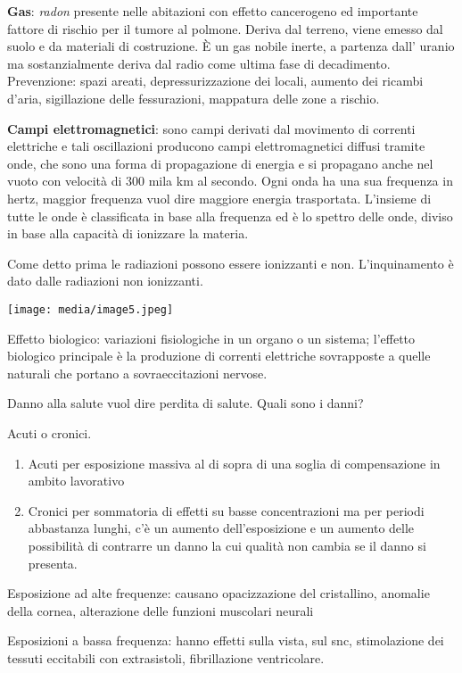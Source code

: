 \documentclass[]{article}
\begin{document}
\textbf{Gas}: \emph{radon} presente nelle abitazioni con effetto
cancerogeno ed importante fattore di rischio per il tumore al polmone.
Deriva dal terreno, viene emesso dal suolo e da materiali di
costruzione. È un gas nobile inerte, a partenza dall' uranio ma
sostanzialmente deriva dal radio come ultima fase di decadimento.
Prevenzione: spazi areati, depressurizzazione dei locali, aumento dei
ricambi d'aria, sigillazione delle fessurazioni, mappatura delle zone a
rischio.

\textbf{Campi elettromagnetici}: sono campi derivati dal movimento di
correnti elettriche e tali oscillazioni producono campi elettromagnetici
diffusi tramite onde, che sono una forma di propagazione di energia e si
propagano anche nel vuoto con velocità di 300 mila km al secondo. Ogni
onda ha una sua frequenza in hertz, maggior frequenza vuol dire maggiore
energia trasportata. L'insieme di tutte le onde è classificata in base
alla frequenza ed è lo spettro delle onde, diviso in base alla capacità
di ionizzare la materia.

Come detto prima le radiazioni possono essere ionizzanti e non.
L'inquinamento è dato dalle radiazioni non ionizzanti.

\texttt{[image: media/image5.jpeg]}

Effetto biologico: variazioni fisiologiche in un organo o un sistema;
l'effetto biologico principale è la produzione di correnti elettriche
sovrapposte a quelle naturali che portano a sovraeccitazioni nervose.

Danno alla salute vuol dire perdita di salute. Quali sono i danni?

Acuti o cronici.

\begin{enumerate}
\def\labelenumi{\arabic{enumi}.}
\item
  Acuti per esposizione massiva al di sopra di una soglia di
  compensazione in ambito lavorativo
\item
  Cronici per sommatoria di effetti su basse concentrazioni ma per
  periodi abbastanza lunghi, c'è un aumento dell'esposizione e un
  aumento delle possibilità di contrarre un danno la cui qualità non
  cambia se il danno si presenta.
\end{enumerate}

Esposizione ad alte frequenze: causano opacizzazione del cristallino,
anomalie della cornea, alterazione delle funzioni muscolari neurali

Esposizioni a bassa frequenza: hanno effetti sulla vista, sul snc,
stimolazione dei tessuti eccitabili con extrasistoli, fibrillazione
ventricolare.
\end{document}
